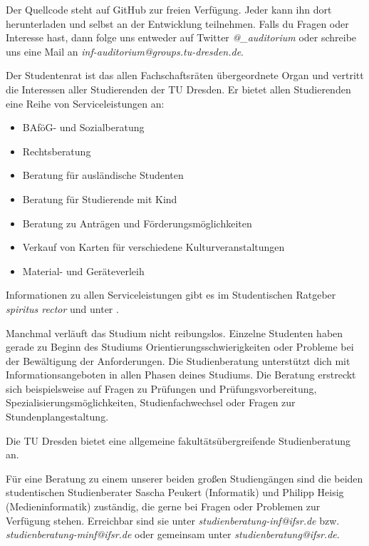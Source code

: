 Der Quellcode steht auf GitHub  zur freien Verfügung.
Jeder kann ihn dort herunterladen und selbst an der Entwicklung teilnehmen.
Falls du Fragen oder Interesse hast, dann folge uns entweder auf Twitter \textit{@\_auditorium} oder schreibe uns eine Mail an \textit{inf-auditorium@groups.tu-dresden.de}.

\newpage

Der Studentenrat ist das allen Fachschaftsräten übergeordnete Organ und vertritt die Interessen aller Studierenden der TU Dresden. Er bietet allen Studierenden eine Reihe von Serviceleistungen an:
\begin{itemize}
\item BAföG- und Sozialberatung
\item Rechtsberatung
\item Beratung für ausländische Studenten
\item Beratung für Studierende mit Kind
\item Beratung zu Anträgen und Förderungsmöglichkeiten
\item Verkauf von Karten für verschiedene Kulturveranstaltungen
\item Material- und Geräteverleih
\end{itemize}

Informationen zu allen Serviceleistungen gibt es im Studentischen Ratgeber \textit{spiritus rector}  und unter .

Manchmal verläuft das Studium nicht reibungslos.
Einzelne Studenten haben gerade zu Beginn des Studiums Orientierungsschwierigkeiten oder Probleme bei der Bewältigung der Anforderungen.
Die Studienberatung unterstützt dich mit Informationsangeboten in allen Phasen deines Studiums.
Die Beratung erstreckt sich beispielsweise auf Fragen zu Prüfungen und Prüfungsvorbereitung, Spezialisierungsmöglichkeiten, Studienfachwechsel oder Fragen zur Stundenplangestaltung.

Die TU Dresden bietet eine allgemeine fakultätsübergreifende Studienberatung  an.

Für eine Beratung zu einem unserer beiden großen Studiengängen sind die beiden studentischen Studienberater Sascha Peukert (Informatik) und Philipp Heisig (Medieninformatik) zuständig, die gerne bei Fragen oder Problemen zur Verfügung stehen. Erreichbar sind sie unter \textit{studienberatung-inf@ifsr.de} bzw. \textit{studienberatung-minf@ifsr.de} oder gemeinsam unter \textit{studienberatung@ifsr.de}.

